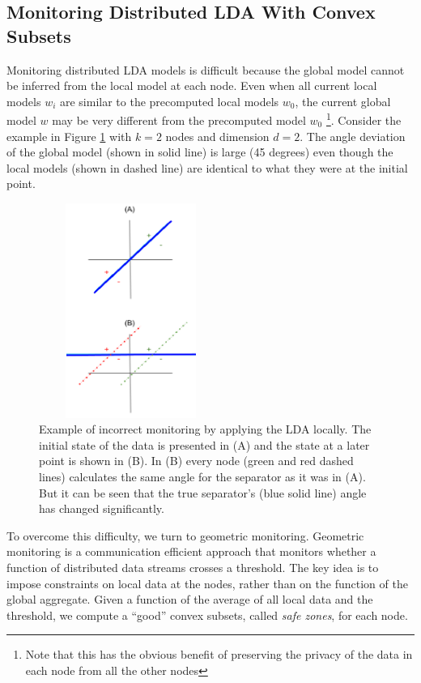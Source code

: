 \documentclass{sig-alternate-05-2015}
\begin{document}
\subsection{Monitoring Distributed LDA With Convex Subsets}
Monitoring distributed LDA models is difficult because the
global model cannot be inferred from the local model at each
node. Even when all current local models $w_i$ are similar to the precomputed
local models $w_0$, the current global model $w$ may
be very different from the precomputed model $w_0$
\footnote{Note that this has the obvious benefit of preserving the privacy
of the data in each node from all the other nodes}.
Consider the example in Figure \ref{NegativeExample} with $k = 2$ nodes
and dimension $d =2$.
The angle deviation of the global model (shown in solid line) is large (45 degrees)
even though the local models (shown in dashed line) are identical to what they
were at the initial point.

\begin{figure}[h]
\centering
\includegraphics[width=60mm, height=7cm]{NegativeExample.png}
\caption{Example of incorrect monitoring by applying the LDA locally. The
initial state of the data is presented in (A) and the state at a later point
is shown in (B). In (B) every node (green and red dashed lines) calculates the same angle
for the separator as it was in (A). But it can be
seen that the true separator's (blue solid line) angle has changed
significantly.}
\label{NegativeExample}
\end{figure}


\par To overcome this difficulty, we turn to geometric monitoring. Geometric
monitoring \cite{keren2014geometric, keren2012shape} is a communication
efficient approach that monitors whether a function of distributed
data streams crosses a threshold. The key idea is to
impose constraints on local data at the nodes, rather than
on the function of the global aggregate. Given a function of
the average of all local data and the threshold, we compute a
``good'' convex subsets, called \textit{safe zones}, for each
node.
\end{document}
